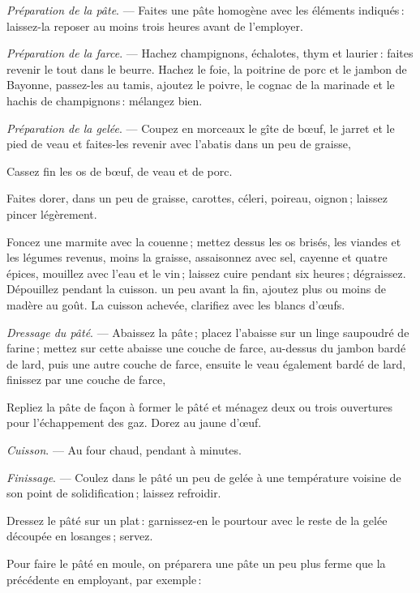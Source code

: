\smallskip
\textit{Préparation de la pâte}. — Faites une pâte homogène avec les éléments
indiqués : laissez-la reposer au moins trois heures avant de l'employer.

\smallskip
\textit{Préparation de la farce}. — Hachez champignons, échalotes, thym et
laurier : faites revenir le tout dans le beurre. Hachez le foie, la poitrine de
porc et le jambon de Bayonne, passez-les au tamis, ajoutez le poivre, le cognac
de la marinade et le hachis de champignons : mélangez bien.

\smallskip
\textit{Préparation de la gelée}. — Coupez en morceaux le gîte de bœuf, le
jarret et le pied de veau et faites-les revenir avec l'abatis dans un peu de
graisse,

Cassez fin les os de bœuf, de veau et de porc.

Faites dorer, dans un peu de graisse, carottes, céleri, poireau, oignon ; laissez
pincer légèrement.

Foncez une marmite avec la couenne ; mettez dessus les os brisés, les viandes
et les légumes revenus, moins la graisse, assaisonnez avec sel, cayenne et
quatre épices, mouillez avec l'eau et le vin ; laissez cuire pendant six
heures ; dégraissez. Dépouillez pendant la cuisson. un peu avant la fin,
ajoutez plus ou moins de madère au goût. La cuisson achevée, clarifiez avec les
blancs d'œufs.

\smallskip
\textit{Dressage du pâté}. — Abaissez la pâte ; placez l'abaisse sur un linge
saupoudré de farine ; mettez sur cette abaisse une couche de farce, au-dessus
du jambon bardé de lard, puis une autre couche de farce, ensuite le veau
également bardé de lard, finissez par une couche de farce,

Repliez la pâte de façon à former le pâté et ménagez deux ou trois ouvertures
pour l’échappement des gaz. Dorez au jaune d'œuf.

\smallskip
\textit{Cuisson}. — Au four chaud, pendant {\mmm} à {\mmm} minutes.

\smallskip
\textit{Finissage}. — Coulez dans le pâté un peu de gelée à une température
voisine de son point de solidification ; laissez refroidir.

Dressez le pâté sur un plat : garnissez-en le pourtour avec le reste de la
gelée découpée en losanges ; servez.

\sk

Pour faire le pâté en moule, on préparera une pâte un peu plus ferme que la
précédente en employant, par exemple :

